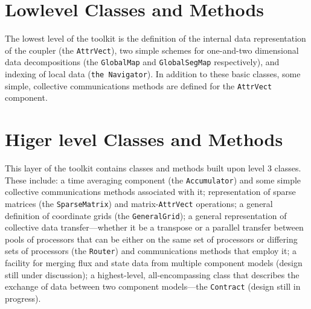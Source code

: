 \documentclass{article}
\begin{document}
\section{Lowlevel Classes and Methods}
The lowest level of the toolkit is the definition of the internal 
data representation of the coupler (the {\tt AttrVect}), two simple 
schemes for one-and-two dimensional data decompositions (the 
{\tt GlobalMap} and {\tt GlobalSegMap} respectively), and indexing 
of local data ({\tt the Navigator}).  In addition to these basic 
classes, some simple, collective communications methods are defined
for the {\tt AttrVect} component.

\section{Higer level Classes and Methods}
This layer of the toolkit contains classes and methods built upon 
level 3  classes.  These include:  a time averaging component (the 
{\tt Accumulator}) and some simple collective communications 
methods associated with it; representation of sparse matrices 
(the {\tt SparseMatrix}) and matrix-{\tt AttrVect} operations;
a general definition of coordinate grids (the {\tt GeneralGrid});
a general representation of collective data transfer---whether it be 
a transpose or a parallel transfer between pools of processors that 
can be either on the same set of processors or differing sets of 
processors (the {\tt Router}) and communications methods that employ
it; a facility for merging flux and state data from multiple component 
models (design still under discussion); a highest-level, all-encompassing
 class that describes the exchange of data between two component 
models---the {\tt Contract} (design still in progress).



 
%
\end{document}
